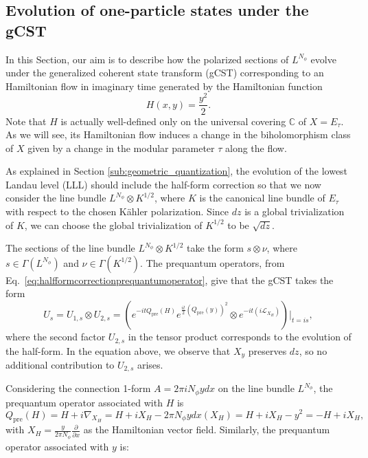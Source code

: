 \documentclass[a4paper,11pt]{article}
\newcommand{\C}{\mathbb{C}}
\begin{document}
\subsection{Evolution of one-particle states under the gCST}
\label{sub:evolutionsingleparticle}
In this Section, our aim is to describe how the polarized sections of $L^{N_{\phi}}$ evolve under the generalized coherent state transform (gCST) corresponding to an Hamiltonian flow in imaginary time generated by the Hamiltonian function $$H(x,y)= \frac{y^2}{2}.$$ Note that $H$ is actually well-defined only 
on the universal covering $\C$ of $X=E_\tau$. As we will see, its Hamiltonian flow induces a change in the biholomorphism class of $X$ given by a change in the modular parameter $\tau$ along the flow.

As explained in Section \ref{sub:geometric_quantization}, the evolution of the lowest Landau level (LLL) should include the half-form correction so that we now consider the line bundle $L^{N_{\phi}}\otimes K^{1/2}$, where $K$ is the canonical line bundle of $E_{\tau}$ with respect to the chosen Kähler polarization. Since $dz$ is a global trivialization of $K$, we can choose the global trivialization of $K^{1/2}$ to be $\sqrt{dz}$.

The sections of the line bundle $L^{N_{\phi}}\otimes K^{1/2}$ take the form $s\otimes \nu$, where $s \in \Gamma(L^{N_{\phi}})$ and $\nu \in \Gamma(K^{1/2})$. The prequantum operators,  from Eq.~\eqref{eq:halfformcorrectionprequantumoperator}, give that the gCST takes the form
\begin{equation}
   U_{s} = U_{1,s} \otimes U_{2,s}=\left(e^{-itQ_{\mathrm{pre}}(H)}e^{\frac{it}{2}(Q_{\mathrm{pre}}(y))^2} \otimes 
   e^{-it\left(i\mathcal{L}_{X_{H}}\right)}  \right)\bigg|_{t=is},
\end{equation}
where the second factor $U_{2,s}$ in the tensor product corresponds to the evolution of the half-form. In the equation above, we observe that $X_y$ preserves $dz$, so no additional contribution to $U_{2,s}$ arises.

 
Considering the connection 1-form $A = 2\pi i N_{\phi} y dx$ on the line bundle $L^{N_{\phi}}$, the prequantum operator associated with $H$ is
\begin{equation}
   Q_{\mathrm{pre}}(H) = H + i\nabla_{X_{H}} = H +iX_{H}-2\pi N_{\phi}ydx(X_{H}) = H +iX_{H}- y^2 = -H + iX_{H},
\end{equation}
with $X_{H} = \frac{y}{2\pi N_{\phi}} \frac{\partial}{\partial x}$ as the Hamiltonian vector field. Similarly, the prequantum operator associated with $y$ is:
\end{document}
